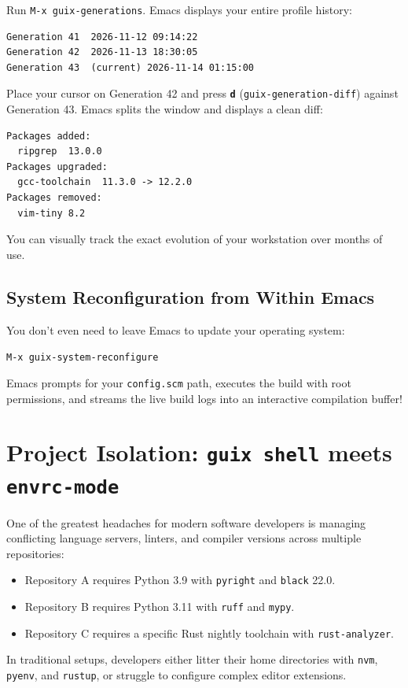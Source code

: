 Run \texttt{M-x guix-generations}. Emacs displays your entire profile history:

\begin{lstlisting}[style=guixcli]
Generation 41  2026-11-12 09:14:22
Generation 42  2026-11-13 18:30:05
Generation 43  (current) 2026-11-14 01:15:00
\end{lstlisting}

Place your cursor on Generation 42 and press \textbf{\texttt{d}} (\texttt{guix-generation-diff}) against Generation 43. Emacs splits the window and displays a clean diff:
\begin{lstlisting}[style=guixcli]
Packages added:
  ripgrep  13.0.0
Packages upgraded:
  gcc-toolchain  11.3.0 -> 12.2.0
Packages removed:
  vim-tiny 8.2
\end{lstlisting}
You can visually track the exact evolution of your workstation over months of use.

\subsection{System Reconfiguration from Within Emacs}

You don't even need to leave Emacs to update your operating system:
\begin{center}
\texttt{M-x guix-system-reconfigure}
\end{center}
Emacs prompts for your \texttt{config.scm} path, executes the build with root permissions, and streams the live build logs into an interactive compilation buffer!

\section{Project Isolation: \texttt{guix shell} meets \texttt{envrc-mode}}

One of the greatest headaches for modern software developers is managing conflicting language servers, linters, and compiler versions across multiple repositories:
\begin{itemize}
  \item Repository A requires Python 3.9 with \texttt{pyright} and \texttt{black} 22.0.
  \item Repository B requires Python 3.11 with \texttt{ruff} and \texttt{mypy}.
  \item Repository C requires a specific Rust nightly toolchain with \texttt{rust-analyzer}.
\end{itemize}

In traditional setups, developers either litter their home directories with \texttt{nvm}, \texttt{pyenv}, and \texttt{rustup}, or struggle to configure complex editor extensions.

